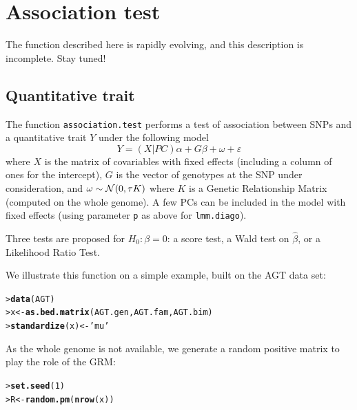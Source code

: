 \documentclass{article}\usepackage[]{graphicx}\usepackage[]{color}
\makeatletter
\newcommand{\hlnum}[1]{\textcolor[rgb]{0.686,0.059,0.569}{#1}}%
\newcommand{\hlstr}[1]{\textcolor[rgb]{0.192,0.494,0.8}{#1}}%
\newcommand{\hlstd}[1]{\textcolor[rgb]{0.345,0.345,0.345}{#1}}%
\newcommand{\hlkwb}[1]{\textcolor[rgb]{0.69,0.353,0.396}{#1}}%
\newcommand{\hlkwd}[1]{\textcolor[rgb]{0.737,0.353,0.396}{\textbf{#1}}}%
\newenvironment{kframe}{%
 \def\at@end@of@kframe{}%
 \ifinner\ifhmode%
  \def\at@end@of@kframe{\end{minipage}}%
  \begin{minipage}{\columnwidth}%
 \fi\fi%
 \def\FrameCommand##1{\hskip\@totalleftmargin \hskip-\fboxsep
 \colorbox{shadecolor}{##1}\hskip-\fboxsep
     \hskip-\linewidth \hskip-\@totalleftmargin \hskip\columnwidth}%
 \MakeFramed {\advance\hsize-\width
   \@totalleftmargin\z@ \linewidth\hsize
   \@setminipage}}%
 {\par\unskip\endMakeFramed%
 \at@end@of@kframe}
\newenvironment{knitrout}{}{} %
\makeatother
\begin{document}
\vfill\eject
\section{Association test}

The function described here is rapidly evolving, and this description is incomplete. 
Stay tuned!

\subsection{Quantitative trait}

  The function \verb!association.test! performs a test of association between SNPs 
  and a quantitative trait $Y$ under the following model
\begin{equation*}
  Y = (X|PC)\alpha + G\beta + \omega + \varepsilon 
\end{equation*}
  where $X$ is the matrix of covariables with fixed effects (including a column 
  of ones for the intercept), $G$ is the vector of genotypes at the SNP under
  consideration, and $\omega\sim\mathcal{N}(0,\tau K)$ where $K$ is a Genetic Relationship
  Matrix (computed on the whole genome). A few PCs can be included in the model
  with fixed effects (using parameter \verb!p! as above for \verb!lmm.diago!).

  Three tests are proposed for $H_0: \beta = 0$: a score test, a Wald test on $\widehat\beta$,
  or a Likelihood Ratio Test.

  We illustrate this function on a simple example, built on the AGT data set:
\begin{knitrout}
\color{fgcolor}\begin{kframe}
\begin{alltt}
\hlstd{> }\hlkwd{data}\hlstd{(AGT)}
\hlstd{> }\hlstd{x} \hlkwb{<-} \hlkwd{as.bed.matrix}\hlstd{(AGT.gen, AGT.fam, AGT.bim)}
\hlstd{> }\hlkwd{standardize}\hlstd{(x)} \hlkwb{<-} \hlstr{'mu'}
\end{alltt}
\end{kframe}
\end{knitrout}

  As the whole genome is not available, we generate a random positive matrix to play the role of the GRM:
\begin{knitrout}
\color{fgcolor}\begin{kframe}
\begin{alltt}
\hlstd{> }\hlkwd{set.seed}\hlstd{(}\hlnum{1}\hlstd{)}
\hlstd{> }\hlstd{R} \hlkwb{<-} \hlkwd{random.pm}\hlstd{(}\hlkwd{nrow}\hlstd{(x))}
\end{alltt}
\end{kframe}
\end{knitrout}
\end{document}
